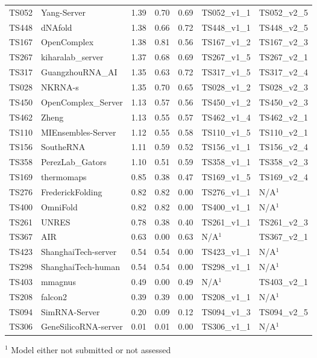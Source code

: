 \begin{table}[ht]
{\begin{tabular}{llrrrll}
TS052 & Yang-Server & 1.39 & 0.70 & 0.69 & TS052\_v1\_1 & TS052\_v2\_5 \\ 
TS448 & dNAfold & 1.38 & 0.66 & 0.72 & TS448\_v1\_1 & TS448\_v2\_5 \\ 
TS167 & OpenComplex & 1.38 & 0.81 & 0.56 & TS167\_v1\_2 & TS167\_v2\_3 \\ 
TS267 & kiharalab\_server & 1.37 & 0.68 & 0.69 & TS267\_v1\_5 & TS267\_v2\_1 \\ 
TS317 & GuangzhouRNA\_AI & 1.35 & 0.63 & 0.72 & TS317\_v1\_5 & TS317\_v2\_4 \\ 
TS028 & NKRNA-s & 1.35 & 0.70 & 0.65 & TS028\_v1\_2 & TS028\_v2\_3 \\ 
TS450 & OpenComplex\_Server & 1.13 & 0.57 & 0.56 & TS450\_v1\_2 & TS450\_v2\_3 \\ 
TS462 & Zheng & 1.13 & 0.55 & 0.57 & TS462\_v1\_4 & TS462\_v2\_1 \\ 
TS110 & MIEnsembles-Server & 1.12 & 0.55 & 0.58 & TS110\_v1\_5 & TS110\_v2\_1 \\ 
TS156 & SoutheRNA & 1.11 & 0.59 & 0.52 & TS156\_v1\_1 & TS156\_v2\_4 \\ 
TS358 & PerezLab\_Gators & 1.10 & 0.51 & 0.59 & TS358\_v1\_1 & TS358\_v2\_3 \\ 
TS169 & thermomaps & 0.85 & 0.38 & 0.47 & TS169\_v1\_5 & TS169\_v2\_4 \\ 
TS276 & FrederickFolding & 0.82 & 0.82 & 0.00 & TS276\_v1\_1 & N/A$^{1}$ \\ 
TS400 & OmniFold & 0.82 & 0.82 & 0.00 & TS400\_v1\_1 & N/A$^{1}$ \\ 
TS261 & UNRES & 0.78 & 0.38 & 0.40 & TS261\_v1\_1 & TS261\_v2\_3 \\ 
TS367 & AIR & 0.63 & 0.00 & 0.63 & N/A$^{1}$ & TS367\_v2\_1 \\ 
TS423 & ShanghaiTech-server & 0.54 & 0.54 & 0.00 & TS423\_v1\_1 & N/A$^{1}$ \\ 
TS298 & ShanghaiTech-human & 0.54 & 0.54 & 0.00 & TS298\_v1\_1 & N/A$^{1}$ \\ 
TS403 & mmagnus & 0.49 & 0.00 & 0.49 & N/A$^{1}$ & TS403\_v2\_1 \\ 
TS208 & falcon2 & 0.39 & 0.39 & 0.00 & TS208\_v1\_1 & N/A$^{1}$ \\ 
TS094 & SimRNA-Server & 0.20 & 0.09 & 0.12 & TS094\_v1\_3 & TS094\_v2\_5 \\ 
TS306 & GeneSilicoRNA-server & 0.01 & 0.01 & 0.00 & TS306\_v1\_1 & N/A$^{1}$ \\ 
\bottomrule
\end{tabular}%
}
\begin{flushleft}\footnotesize $^{1}$ Model either not submitted or not assessed\end{flushleft}
\end{table}

